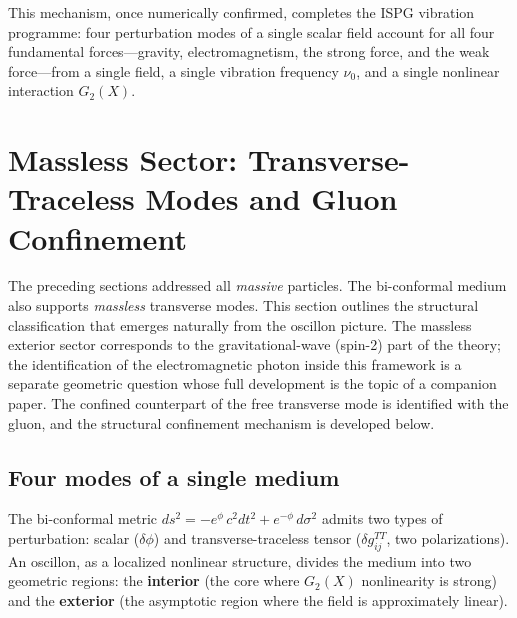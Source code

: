 \documentclass[11pt]{article}
\begin{document}
This mechanism, once numerically confirmed,
completes the ISPG vibration programme: four
perturbation modes of a single scalar field
account for all four fundamental forces---gravity,
electromagnetism, the strong force, and the weak
force---from a single field, a single vibration
frequency $\nu_0$, and a single nonlinear
interaction $G_2(X)$.

\section{Massless Sector: Transverse-Traceless Modes
and Gluon Confinement}
\label{sec:massless}

The preceding sections addressed all
\emph{massive} particles.  The bi-conformal medium
also supports \emph{massless} transverse modes.
This section outlines the structural classification
that emerges naturally from the oscillon picture.
The massless exterior sector corresponds to the
gravitational-wave (spin-2) part of the theory;
the identification of the electromagnetic photon
inside this framework is a separate geometric
question whose full development is the topic of a
companion paper.  The confined counterpart of the
free transverse mode is identified with the gluon,
and the structural confinement mechanism is developed below.

\subsection{Four modes of a single medium}
\label{sec:four_modes}

The bi-conformal metric
$ds^{2} = -e^{\phi}\,c^{2}dt^{2}
+ e^{-\phi}\,d\sigma^{2}$ admits two types of
perturbation: scalar ($\delta\phi$) and
transverse-traceless tensor ($\delta g_{ij}^{TT}$,
two polarizations).  An oscillon, as a localized
nonlinear structure, divides the medium into two
geometric regions: the \textbf{interior}
(the core where $G_2(X)$ nonlinearity is strong)
and the \textbf{exterior} (the asymptotic region
where the field is approximately linear).
\end{document}
